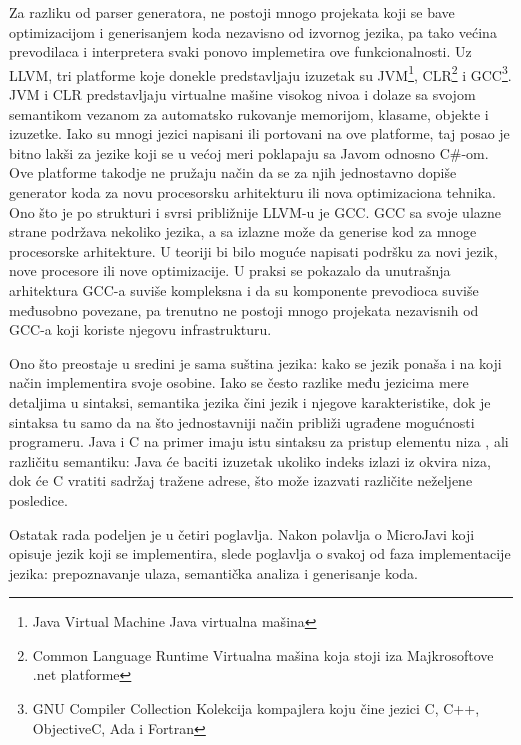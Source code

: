 Za razliku od parser generatora, ne postoji mnogo projekata koji se bave optimizacijom i generisanjem koda nezavisno od izvornog jezika, pa tako većina prevodilaca i interpretera svaki ponovo implemetira ove funkcionalnosti. 
Uz LLVM, tri platforme koje donekle predstavljaju izuzetak su 
JVM\footnote{\skr \eng Java Virtual Machine \ndash Java virtualna mašina}, 
CLR\footnote{\skr \eng Common Language Runtime \ndash Virtualna mašina koja stoji iza Majkrosoftove .net platforme} 
i GCC\footnote{\skr \eng GNU Compiler Collection \ndash Kolekcija kompajlera koju čine jezici C, C++, ObjectiveC, Ada i Fortran}. 
JVM i CLR predstavljaju virtualne mašine visokog nivoa i dolaze sa svojom semantikom vezanom za automatsko rukovanje memorijom, klasame, objekte i izuzetke. 
Iako su mnogi jezici napisani ili portovani na ove platforme, taj posao je bitno lakši za jezike koji se u većoj meri poklapaju sa Javom odnosno C\#-om. 
Ove platforme takodje ne pružaju način da se za njih jednostavno dopiše generator koda za novu procesorsku arhitekturu ili nova optimizaciona tehnika. 
Ono što je po strukturi i svrsi približnije LLVM-u je GCC.
GCC sa svoje ulazne strane podržava nekoliko jezika, a sa izlazne može da generise kod za mnoge procesorske arhitekture.
U teoriji bi bilo moguće napisati podršku za novi jezik, nove procesore ili nove optimizacije.
U praksi se pokazalo da unutrašnja arhitektura GCC-a suviše kompleksna i da su komponente prevodioca suviše međusobno povezane, pa trenutno ne postoji mnogo projekata nezavisnih od GCC-a koji koriste njegovu infrastrukturu.

Ono što preostaje u sredini je sama suština jezika: kako se jezik ponaša i na koji način implementira svoje osobine.
Iako se često razlike među jezicima mere detaljima u sintaksi, semantika jezika čini jezik  i njegove karakteristike, dok je sintaksa tu samo da na što jednostavniji način približi ugrađene mogućnosti programeru.
Java i C na primer imaju istu sintaksu za pristup elementu niza \ndash {}, ali različitu semantiku: 
Java će baciti izuzetak ukoliko indeks izlazi iz okvira niza, dok će C vratiti sadržaj tražene adrese, što može izazvati različite neželjene posledice.

Ostatak rada podeljen je u četiri poglavlja.
Nakon polavlja o MicroJavi koji opisuje jezik koji se implementira, slede poglavlja o svakoj od faza implementacije jezika: prepoznavanje ulaza, semantička analiza i generisanje koda.
